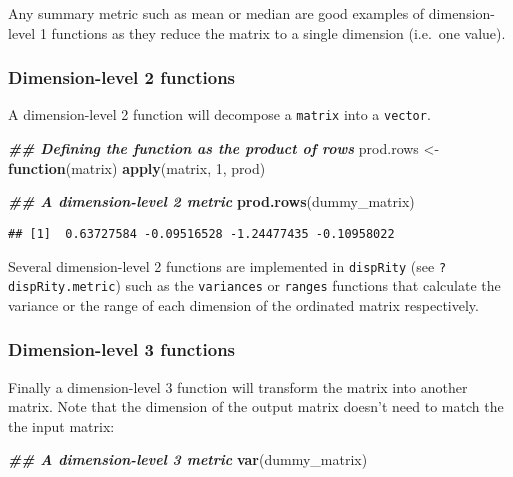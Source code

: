 \documentclass[
]{book}
\newenvironment{Shaded}{\begin{snugshade}}{\end{snugshade}}
\newcommand{\ControlFlowTok}[1]{\textcolor[rgb]{0.13,0.29,0.53}{\textbf{#1}}}
\newcommand{\DecValTok}[1]{\textcolor[rgb]{0.00,0.00,0.81}{#1}}
\newcommand{\DocumentationTok}[1]{\textcolor[rgb]{0.56,0.35,0.01}{\textbf{\textit{#1}}}}
\newcommand{\FunctionTok}[1]{\textcolor[rgb]{0.13,0.29,0.53}{\textbf{#1}}}
\newcommand{\NormalTok}[1]{#1}
\newcommand{\OtherTok}[1]{\textcolor[rgb]{0.56,0.35,0.01}{#1}}
\begin{document}
Any summary metric such as mean or median are good examples of dimension-level 1 functions as they reduce the matrix to a single dimension (i.e.~one value).

\hypertarget{dimension-level-2-functions}{%
\subsubsection{Dimension-level 2 functions}\label{dimension-level-2-functions}}

A dimension-level 2 function will decompose a \texttt{matrix} into a \texttt{vector}.

\begin{Shaded}
\begin{Highlighting}[]
\DocumentationTok{\#\# Defining the function as the product of rows}
\NormalTok{prod.rows }\OtherTok{\textless{}{-}} \ControlFlowTok{function}\NormalTok{(matrix) }\FunctionTok{apply}\NormalTok{(matrix, }\DecValTok{1}\NormalTok{, prod)}

\DocumentationTok{\#\# A dimension{-}level 2 metric}
\FunctionTok{prod.rows}\NormalTok{(dummy\_matrix)}
\end{Highlighting}
\end{Shaded}

\begin{verbatim}
## [1]  0.63727584 -0.09516528 -1.24477435 -0.10958022
\end{verbatim}

Several dimension-level 2 functions are implemented in \texttt{dispRity} (see \texttt{?dispRity.metric}) such as the \texttt{variances} or \texttt{ranges} functions that calculate the variance or the range of each dimension of the ordinated matrix respectively.

\hypertarget{dimension-level-3-functions}{%
\subsubsection{Dimension-level 3 functions}\label{dimension-level-3-functions}}

Finally a dimension-level 3 function will transform the matrix into another matrix.
Note that the dimension of the output matrix doesn't need to match the the input matrix:

\begin{Shaded}
\begin{Highlighting}[]
\DocumentationTok{\#\# A dimension{-}level 3 metric}
\FunctionTok{var}\NormalTok{(dummy\_matrix)}
\end{Highlighting}
\end{Shaded}
\end{document}
